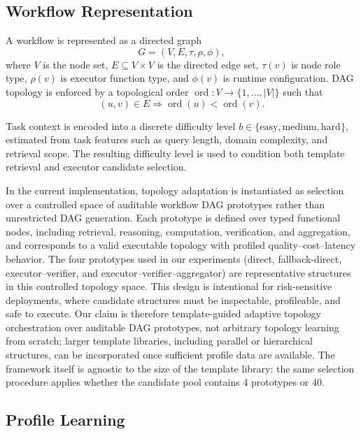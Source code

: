 \documentclass[acmsmall,review,anonymous]{acmart}
\begin{document}
\subsection{Workflow Representation}

A workflow is represented as a directed graph
\begin{equation}
G=(V,E,\tau,\rho,\phi),
\end{equation}
where $V$ is the node set, $E\subseteq V\times V$ is the directed edge set, $\tau(v)$ is node role type, $\rho(v)$ is executor function type, and $\phi(v)$ is runtime configuration. DAG topology is enforced by a topological order $\operatorname{ord}:V\rightarrow\{1,\dots,|V|\}$ such that
\begin{equation}
(u,v)\in E\Rightarrow \operatorname{ord}(u)<\operatorname{ord}(v).
\end{equation}

Task context is encoded into a discrete difficulty level $b \in \{\text{easy}, \text{medium}, \text{hard}\}$, estimated from task features such as query length, domain complexity, and retrieval scope. The resulting difficulty level is used to condition both template retrieval and executor candidate selection.

In the current implementation, topology adaptation is instantiated as selection over a controlled space of auditable workflow DAG prototypes rather than unrestricted DAG generation. Each prototype is defined over typed functional nodes, including retrieval, reasoning, computation, verification, and aggregation, and corresponds to a valid executable topology with profiled quality--cost--latency behavior. The four prototypes used in our experiments (direct, fallback-direct, executor--verifier, and executor--verifier--aggregator) are representative structures in this controlled topology space. This design is intentional for risk-sensitive deployments, where candidate structures must be inspectable, profileable, and safe to execute. Our claim is therefore template-guided adaptive topology orchestration over auditable DAG prototypes, not arbitrary topology learning from scratch; larger template libraries, including parallel or hierarchical structures, can be incorporated once sufficient profile data are available. The framework itself is agnostic to the size of the template library: the same selection procedure applies whether the candidate pool contains 4 prototypes or 40.

\subsection{Profile Learning}
\end{document}
